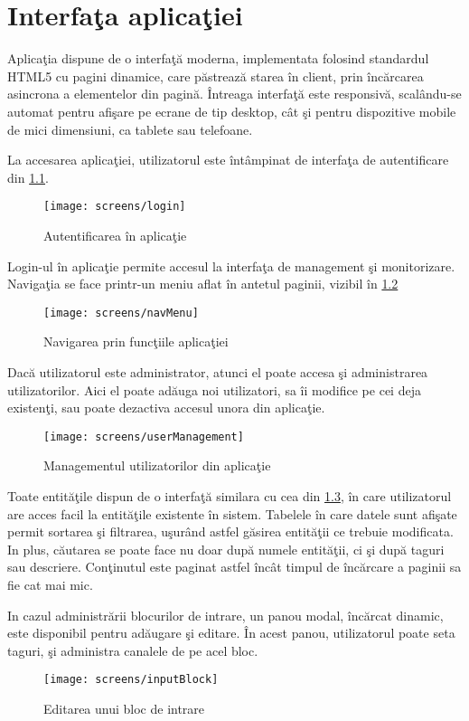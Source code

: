 \chapter{Interfaţa aplicaţiei}
\label{chapter:interfata}

Aplicaţia dispune de o interfaţă moderna, implementata folosind standardul HTML5 cu pagini dinamice, care păstrează starea în client, prin încărcarea asincrona a elementelor din pagină. Întreaga interfaţă este responsivă, scalându-se automat pentru afişare pe ecrane de tip desktop, cât şi pentru dispozitive mobile de mici dimensiuni, ca tablete sau telefoane.

La accesarea aplicaţiei, utilizatorul este întâmpinat de interfaţa de autentificare din \cref{fig:login}. 
\begin{figure}[H]
	\centering
	\texttt{[image: screens/login]}
	\captionsetup{justification=centering}
	\caption{Autentificarea în aplicaţie}
	\label{fig:login}
\end{figure}
Login-ul în aplicaţie permite accesul la interfaţa de management şi monitorizare. Navigaţia se face printr-un meniu aflat în antetul paginii, vizibil în \cref{fig:navMenu}
\begin{figure}[H]
	\centering
	\texttt{[image: screens/navMenu]}
	\captionsetup{justification=centering}
	\caption{Navigarea prin funcţiile aplicaţiei}
	\label{fig:navMenu}
\end{figure}
Dacă utilizatorul este administrator, atunci el poate accesa şi administrarea utilizatorilor. Aici el poate adăuga noi utilizatori, sa îi modifice pe cei deja existenţi, sau poate dezactiva accesul unora din aplicaţie.
\begin{figure}[H]
	\centering
	\texttt{[image: screens/userManagement]}
	\captionsetup{justification=centering}
	\caption{Managementul utilizatorilor din aplicaţie}
	\label{fig:userManagement}
\end{figure}
Toate entităţile dispun de o interfaţă similara cu cea din \cref{fig:userManagement}, în care utilizatorul are acces facil la entităţile existente în sistem. Tabelele în care datele sunt afişate permit sortarea şi filtrarea, uşurând astfel găsirea entităţii ce trebuie modificata. In plus, căutarea se poate face nu doar după numele entităţii, ci şi după taguri sau descriere. Conţinutul este paginat astfel încât timpul de încărcare a paginii sa fie cat mai mic.

In cazul administrării blocurilor de intrare, un panou modal, încărcat dinamic, este disponibil pentru adăugare şi editare. În acest panou, utilizatorul poate seta taguri, şi administra canalele de pe acel bloc.
\begin{figure}[H]
	\centering
	\texttt{[image: screens/inputBlock]}
	\captionsetup{justification=centering}
	\caption{Editarea unui bloc de intrare}
	\label{fig:inputBlock}
\end{figure}

